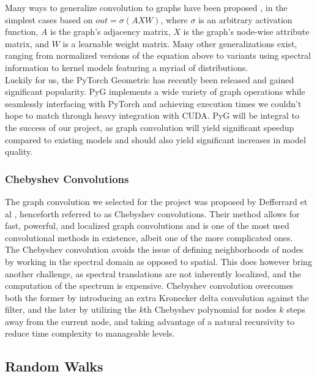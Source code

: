 \documentclass[12pt,twoside]{report}
\begin{document}
Many ways to generalize convolution to graphs have been proposed \cite{wu2019comprehensive}, in the simplest cases based on $out = \sigma (AXW)$, where $\sigma$ is an arbitrary activation function, $A$ is the graph's adjacency matrix, $X$ is the graph's node-wise attribute matrix, and $W$ is a learnable weight matrix. Many other generalizations exist, ranging from normalized versions of the equation above to variants using spectral information to kernel models featuring a myriad of distributions. \\

Luckily for us, the PyTorch Geometric \cite{Fey/Lenssen/2019} has recently been released and gained significant popularity. PyG implements a wide variety of graph operations while seamlessly interfacing with PyTorch and achieving execution times we couldn't hope to match through heavy integration with CUDA. PyG will be integral to the success of our project, as graph convolution will yield significant speedup compared to existing models and should also yield significant increases in model quality. \\

\subsubsection{Chebyshev Convolutions}

The graph convolution we selected for the project was proposed by Defferrard et al \cite{defferrard2016convolutional}, henceforth referred to as Chebyshev convolutions. Their method allows for fast, powerful, and localized graph convolutions and is one of the most used convolutional methods in existence, albeit one of the more complicated ones. \\

The Chebyshev convolution avoids the issue of defining neighborhoods of nodes by working in the spectral domain as opposed to spatial. This does however bring another challenge, as spectral translations are not inherently localized, and the computation of the spectrum is expensive. Chebyshev convolution overcomes both the former by introducing an extra Kronecker delta convolution against the filter, and the later by utilizing the $k$th Chebyshev polynomial for nodes $k$ steps away from the current node, and taking advantage of a natural recursivity to reduce time complexity to manageable levels. \\

\subsection{Random Walks}
\end{document}
